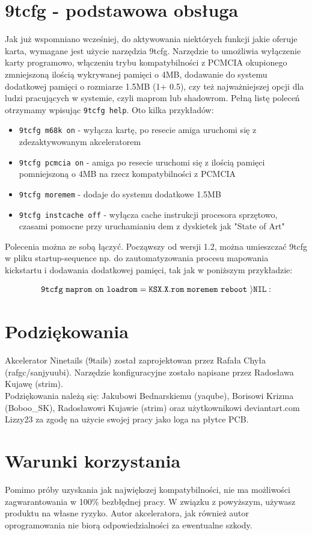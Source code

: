 \documentclass[10pt,a5paper]{article}
\begin{document}
\section *{9tcfg - podstawowa obsługa}

Jak już wspomniano wcześniej, do aktywowania niektórych funkcji jakie oferuje karta, wymagane jest użycie narzędzia 9tcfg. Narzędzie to umożliwia wyłączenie karty programowo, włączeniu trybu kompatybilności z PCMCIA okupionego zmniejszoną ilością wykrywanej pamięci o 4MB, dodawanie do systemu dodatkowej pamięci o rozmiarze 1.5MB (1+ 0.5),  czy też najważniejszej opcji dla ludzi pracujących w systemie, czyli maprom lub shadowrom. Pełną listę poleceń otrzymamy wpisując {\tt 9tcfg help}. Oto kilka przykładów:

\begin{itemize}\itemsep0pt
\item {\tt 9tcfg m68k on} - wyłącza kartę, po resecie amiga uruchomi się z zdezaktywowanym akceleratorem
\item {\tt 9tcfg pcmcia on} - amiga po resecie uruchomi się z ilością pamięci pomniejszoną o 4MB na rzecz kompatybilności z PCMCIA
\item {\tt 9tcfg moremem} - dodaje do systemu dodatkowe 1.5MB
\item {\tt 9tcfg instcache off} - wyłącza cache instrukcji procesora sprzętowo, czasami pomocne przy uruchamianiu dem z dyskietek jak "State of Art"
\end{itemize}

Polecenia można ze sobą łączyć. Począwszy od wersji 1.2, można umieszczać 9tcfg w pliku startup-sequence np. do zautomatyzowania procesu mapowania kickstartu i dodawania dodatkowej pamięci, tak jak w poniższym przykładzie:



{$$\tt 9tcfg \  maprom \  on \  loadrom=KSX.X.rom \  moremem \  reboot \  \rangle NIL:$$}


\section*{Podziękowania}

Akcelerator Ninetails (9tails) został zaprojektowan przez Rafała Chyła (rafgc/sanjyuubi). Narzędzie konfiguracyjne zostało napisane przez  Radosława Kujawę  (strim).\\

Podziękowania należą się: Jakubowi  Bednarskiemu (yaqube), Borisowi  Krizma (Boboo\_SK), Radosławowi Kujawie (strim) oraz użytkownikowi deviantart.com Lizzy23 za zgodę na użycie swojej pracy jako loga na płytce PCB.


\section*{Warunki korzystania}
Pomimo próby uzyskania jak największej kompatybilności, nie ma możliwości zagwarantowania w 100\% bezbłędnej pracy. W związku z powyższym, używasz produktu na własne ryzyko. Autor akceleratora, jak również autor oprogramowania nie biorą odpowiedzialności za ewentualne szkody.
\end{document}
